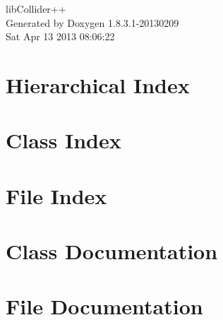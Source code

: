 \documentclass{book}
\begin{document}
\hypersetup{pageanchor=false,citecolor=blue}
\begin{titlepage}
\vspace*{7cm}
\begin{center}
{\Large lib\-Collider++ }\\
\vspace*{1cm}
{\large Generated by Doxygen 1.8.3.1-20130209}\\
\vspace*{0.5cm}
{\small Sat Apr 13 2013 08:06:22}\\
\end{center}
\end{titlepage}
\clearemptydoublepage
{}
\tableofcontents
\clearemptydoublepage
{}
\hypersetup{pageanchor=true,citecolor=blue}
\chapter{Hierarchical Index}

\chapter{Class Index}

\chapter{File Index}

\chapter{Class Documentation}








\chapter{File Documentation}






\printindex
\end{document}
